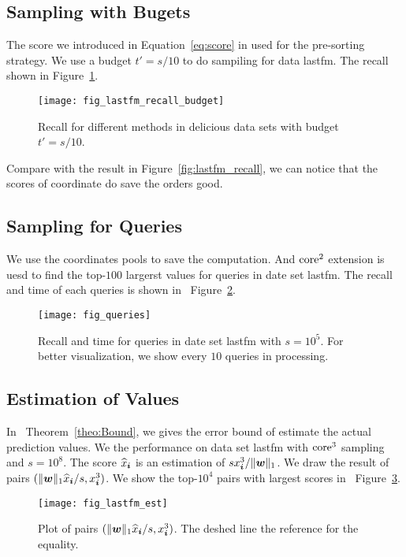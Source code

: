 \documentclass[letterpaper]{article}
\newcommand{\V}[1]{{\bm{{\MakeLowercase{#1}}}}}
\newcommand{\norm}[2]{\|#1\|_{#2}}
\newcommand{\Eqn}[1]   {Equation~\ref{eq:#1}}
\newcommand{\Fig}[1]   {Figure~\ref{fig:#1}}
\newcommand{\Theo}[1] {Theorem~\ref{theo:#1}}
\begin{document}
\subsection{Sampling with Bugets}
The score we introduced in \Eqn{score} in used for the pre-sorting strategy.
We use a budget $t' = s/10$ to do sampiling for data lastfm.
The recall shown in \Fig{budget}.
\begin{figure}[ht]
  \centering
  \texttt{[image: fig\_lastfm\_recall\_budget]}\\
  \caption{Recall for different methods in delicious data sets with budget $t'=s/10$.}
  \label{fig:budget}
\end{figure}
Compare with the result in \Fig{lastfm_recall}, we can notice that the scores of coordinate
do save the orders good.
\subsection{Sampling for Queries}
We use the coordinates pools to save the computation.
And ${\rm core}^2$ extension is uesd 
to find the top-$100$ largerst values for queries in date set lastfm.
The recall and time of each queries is shown in ~\Fig{Queries}.
\begin{figure}[t]
  \centering
  \texttt{[image: fig\_queries]}\\
  \caption{Recall and time for queries in date set lastfm with $s=10^5$.
           For better visualization,
           we show every $10$ queries in processing.}
  \label{fig:Queries}
\end{figure}
\subsection{Estimation of Values}
In ~\Theo{Bound}, we gives the error bound of estimate the actual prediction values.
We the performance on data set lastfm with ${\rm core}^3$ sampling and $s=10^8$.
The score $\widehat{x}_{\V{i}}$ is an estimation of $sx^3_{\V{i}}/\norm{\V{w}}{1}$.
We draw the result of pairs $(\norm{\V{w}}{1}\widehat{x}_{\V{i}}/s,x^3_{\V{i}})$.
We show the top-$10^4$ pairs with largest scores in ~\Fig{Est}.
\begin{figure}[t]
  \centering
  \texttt{[image: fig\_lastfm\_est]}\\
  \caption{Plot of pairs $(\norm{\V{w}}{1}\widehat{x}_{\V{i}}/s,x^3_{\V{i}})$.
          The deshed line the reference for the equality.}
  \label{fig:Est}
\end{figure}
\end{document}
